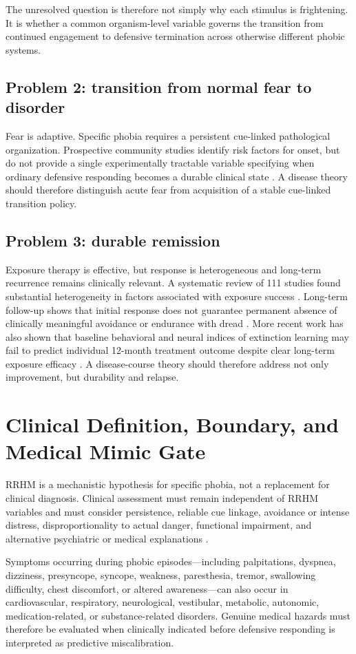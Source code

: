 \documentclass[11pt]{article}
\begin{document}
The unresolved question is therefore not simply why each stimulus is frightening. It is whether a common organism-level variable governs the transition from continued engagement to defensive termination across otherwise different phobic systems.

\subsection{Problem 2: transition from normal fear to disorder}
Fear is adaptive. Specific phobia requires a persistent cue-linked pathological organization. Prospective community studies identify risk factors for onset, but do not provide a single experimentally tractable variable specifying when ordinary defensive responding becomes a durable clinical state \cite{trumpf2010incidence}. A disease theory should therefore distinguish acute fear from acquisition of a stable cue-linked transition policy.

\subsection{Problem 3: durable remission}
Exposure therapy is effective, but response is heterogeneous and long-term recurrence remains clinically relevant. A systematic review of 111 studies found substantial heterogeneity in factors associated with exposure success \cite{bohnlein2020}. Long-term follow-up shows that initial response does not guarantee permanent absence of clinically meaningful avoidance or endurance with dread \cite{lipsitz1999}. More recent work has also shown that baseline behavioral and neural indices of extinction learning may fail to predict individual 12-month treatment outcome despite clear long-term exposure efficacy \cite{devos2025}. A disease-course theory should therefore address not only improvement, but durability and relapse.

\section{Clinical Definition, Boundary, and Medical Mimic Gate}
RRHM is a mechanistic hypothesis for specific phobia, not a replacement for clinical diagnosis. Clinical assessment must remain independent of RRHM variables and must consider persistence, reliable cue linkage, avoidance or intense distress, disproportionality to actual danger, functional impairment, and alternative psychiatric or medical explanations \cite{who2024}.

Symptoms occurring during phobic episodes---including palpitations, dyspnea, dizziness, presyncope, syncope, weakness, paresthesia, tremor, swallowing difficulty, chest discomfort, or altered awareness---can also occur in cardiovascular, respiratory, neurological, vestibular, metabolic, autonomic, medication-related, or substance-related disorders. Genuine medical hazards must therefore be evaluated when clinically indicated before defensive responding is interpreted as predictive miscalibration.
\end{document}
